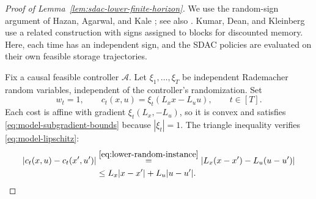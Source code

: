 \documentclass[journal]{IEEEtran}
\theoremstyle{remark}
\begin{document}
\begin{proof}[Proof of Lemma~\ref{lem:sdac-lower-finite-horizon}]
We use the random-sign argument of Hazan, Agarwal, and Kale
\cite[Sec.~2.3, footnote~3]{hazan2007logarithmic}; see also
\cite[Sec.~3.2, Thm.~3.2]{hazan2016introduction}.
Kumar, Dean, and Kleinberg \cite[App.~D, Thm.~D.2]{kumar2023unbounded}
use a related construction with signs assigned to blocks for discounted
memory. Here, each time has an independent sign, and the SDAC policies
are evaluated on their own feasible storage trajectories.

Fix a causal feasible controller $\mathcal{A}$. Let
$\xi_1,\ldots,\xi_T$ be independent Rademacher random variables, independent
of the controller's randomization. Set
\begin{equation}
\label{eq:lower-random-instance}
w_t=1,\qquad c_t(x,u)=\xi_t(L_xx-L_uu),\qquad t\in[T].
\end{equation}
Each cost is affine with gradient $\xi_t(L_x,-L_u)$, so it is convex and
satisfies \eqref{eq:model-subgradient-bounds} because $|\xi_t|=1$.
The triangle inequality verifies \eqref{eq:model-lipschitz}:
\[
\begin{aligned}
|c_t(x,u)-c_t(x',u')|
&\overset{\eqref{eq:lower-random-instance}}{=}
|L_x(x-x')-L_u(u-u')|\\
&\le L_x|x-x'|+L_u|u-u'|.
\end{aligned}
\]


\end{proof}
\end{document}
